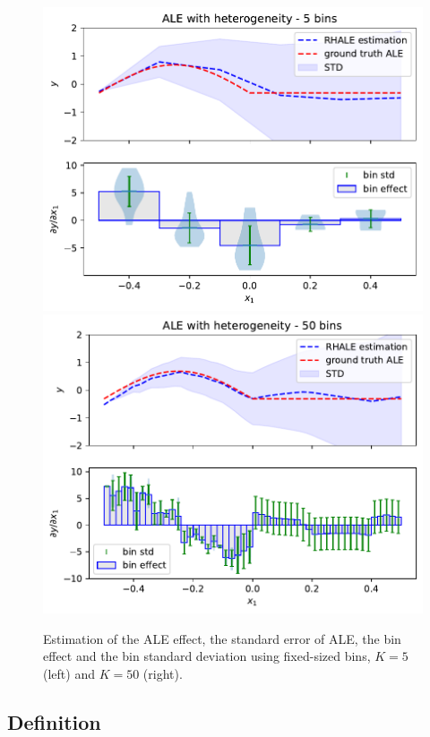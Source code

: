 \documentclass{ecai}  %
\begin{document}
\begin{figure}[t]
  \centering
  \includegraphics[width=.49\linewidth]{concept_figure/exp_1_rhale_5_bins_0}
  \includegraphics[width=.49\linewidth]{concept_figure/exp_1_rhale_50_bins_0}
  \caption{Estimation of the ALE effect, the standard error of ALE, the bin effect and the bin standard deviation using fixed-sized bins, $K=5$ (left) and $K=50$ (right).}
  \label{fig:ale-different-bins}
\end{figure}

\subsection{Definition}
\label{subsec:uale-definition-1}
\end{document}
